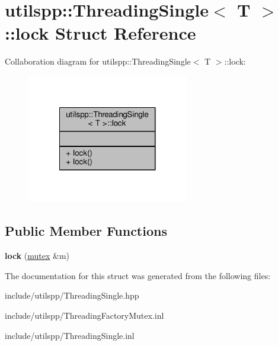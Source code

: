 \hypertarget{structutilspp_1_1ThreadingSingle_1_1lock}{\section{utilspp\-:\-:Threading\-Single$<$ T $>$\-:\-:lock Struct Reference}
\label{structutilspp_1_1ThreadingSingle_1_1lock}
}


Collaboration diagram for utilspp\-:\-:Threading\-Single$<$ T $>$\-:\-:lock\-:
\nopagebreak
\begin{figure}[H]
\begin{center}
\leavevmode
\includegraphics[width=200pt]{structutilspp_1_1ThreadingSingle_1_1lock__coll__graph}
\end{center}
\end{figure}
\subsection*{Public Member Functions}
\begin{DoxyCompactItemize}
\item 
\hypertarget{structutilspp_1_1ThreadingSingle_1_1lock_a9cf9076dcc163b0712120d016eb5b817}{{\bfseries lock} (\hyperlink{structutilspp_1_1ThreadingSingle_1_1mutex}{mutex} \&m)}\label{structutilspp_1_1ThreadingSingle_1_1lock_a9cf9076dcc163b0712120d016eb5b817}

\end{DoxyCompactItemize}


The documentation for this struct was generated from the following files\-:\begin{DoxyCompactItemize}
\item 
include/utilspp/Threading\-Single.\-hpp\item 
include/utilspp/Threading\-Factory\-Mutex.\-inl\item 
include/utilspp/Threading\-Single.\-inl\end{DoxyCompactItemize}
